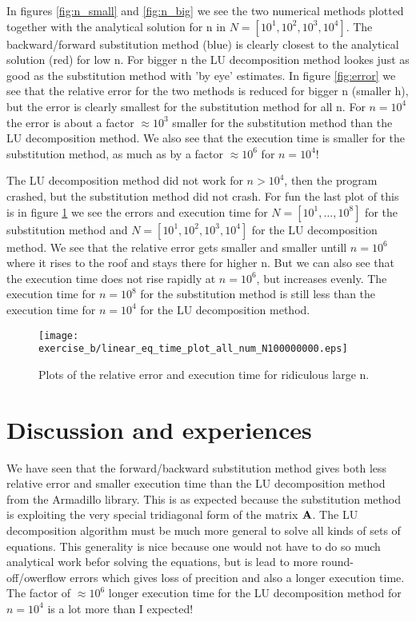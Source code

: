 \documentclass[11pt,a4wide]{article}
\begin{document}
In figures \ref{fig:n_small} and \ref{fig:n_big} we see the two numerical methods plotted together with the analytical solution for n in $N = [10^1, 10^2, 10^3, 10^4]$. The backward/forward substitution method (blue) is clearly closest to the analytical solution (red) for low n. For bigger n the LU decomposition method lookes just as good as the substitution method with 'by eye' estimates. In figure \ref{fig:error} we see that the relative error for the two methods is reduced for bigger n (smaller h), but the error is clearly smallest for the substitution method for all n. For $n=10^4$ the error is about a factor $\approx10^3$ smaller for the substitution method than the LU decomposition method. We also see that the execution time is smaller for the substitution method, as much as by a factor $\approx10^6$ for $n=10^4$!

The LU decomposition method did not work for $n>10^4$, then the program crashed, but the substitution method did not crash. For fun the last plot of this is in figure \ref{fig:tull} we see the errors and execution time for $N = [10^1, \dots, 10^8]$ for the substitution method and $N = [10^1, 10^2, 10^3, 10^4]$ for the LU decomposition method. We see that the relative error gets smaller and smaller untill $n=10^6$ where it rises to the roof and stays there for higher n. But we can also see that the execution time does not rise rapidly at $n=10^6$, but increases evenly. The execution time for $n=10^8$ for the substitution method is still less than the execution time for $n=10^4$ for the LU decomposition method. 

\begin{figure}[htp]
\caption{Plots of the relative error and execution time for ridiculous large n.}
\centering
\texttt{[image: exercise\_b/linear\_eq\_time\_plot\_all\_num\_N100000000.eps]}
\label{fig:tull}
\end{figure}

\section{Discussion and experiences}

We have seen that the forward/backward substitution method gives both less relative error and smaller execution time than the LU decomposition method from the Armadillo library. This is as expected because the substitution method is exploiting the very special tridiagonal form of the matrix ${\bf A}$. The LU decomposition algorithm must be much more general to solve all kinds of sets of equations. This generality is nice because one would not have to do so much analytical work befor solving the equations, but is lead to more round-off/owerflow errors which gives loss of precition and also a longer execution time. The factor of $\approx10^6$ longer execution time for the LU decomposition method for $n=10^4$ is a lot more than I expected! 
\end{document}
